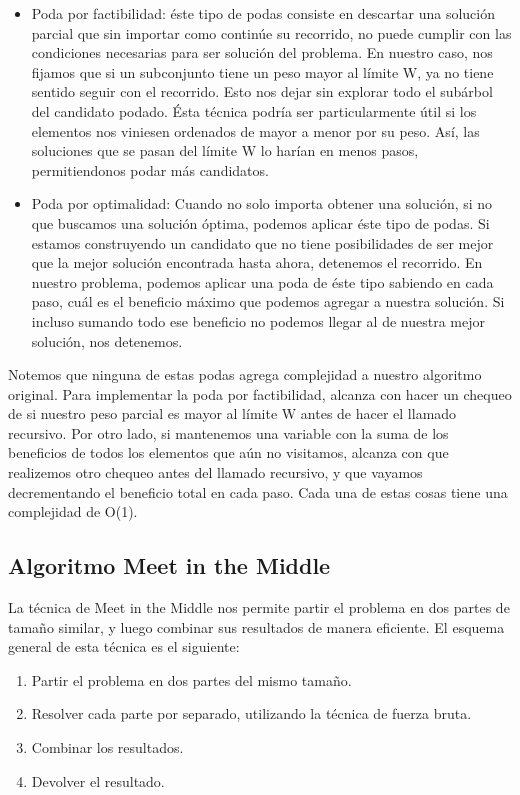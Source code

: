 \begin{itemize}
\item Poda por factibilidad: éste tipo de podas consiste en descartar una solución parcial que sin importar como continúe su recorrido, no puede cumplir con las condiciones necesarias para ser solución del problema. En nuestro caso, nos fijamos que si un subconjunto tiene un peso mayor al límite W, ya no tiene sentido seguir con el recorrido. Esto nos dejar sin explorar todo el subárbol del candidato podado. Ésta técnica podría ser particularmente útil si los elementos nos viniesen ordenados de mayor a menor por su peso. Así, las soluciones que se pasan del límite W lo harían en menos pasos, permitiendonos podar más candidatos.
\item Poda por optimalidad: Cuando no solo importa obtener una solución, si no que buscamos una solución óptima, podemos aplicar éste tipo de podas. Si estamos construyendo un candidato que no tiene posibilidades de ser mejor que la mejor solución encontrada hasta ahora, detenemos el recorrido. En nuestro problema, podemos aplicar una poda de éste tipo sabiendo en cada paso, cuál es el beneficio máximo que podemos agregar a nuestra solución. Si incluso sumando todo ese beneficio no podemos llegar al de nuestra mejor solución, nos detenemos.
\end{itemize}

Notemos que ninguna de estas podas agrega complejidad a nuestro algoritmo original. Para implementar la poda por factibilidad, alcanza con hacer un chequeo de si nuestro peso parcial es mayor al límite W antes de hacer el llamado recursivo. Por otro lado, si mantenemos una variable con la suma de los beneficios de todos los elementos que aún no visitamos, alcanza con que realizemos otro chequeo antes del llamado recursivo, y que vayamos decrementando el beneficio total en cada paso. Cada una de estas cosas tiene una complejidad de O(1).


\subsection{Algoritmo Meet in the Middle}

La técnica de Meet in the Middle nos permite partir el problema en dos partes de tamaño similar, y luego combinar sus resultados de manera eficiente.
El esquema general de esta técnica es el siguiente:

\begin{enumerate}
\item Partir el problema en dos partes del mismo tamaño.
\item Resolver cada parte por separado, utilizando la técnica de fuerza bruta.
\item Combinar los resultados.
\item Devolver el resultado.
\end{enumerate}

